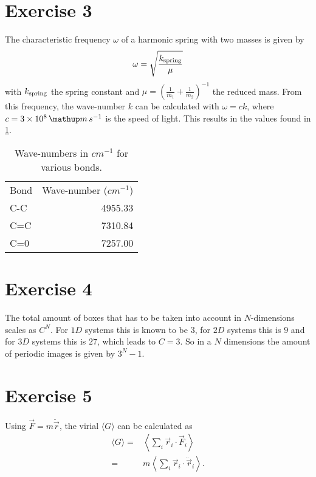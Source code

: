 \documentclass[titlepage]{report}
\begin{document}
\section{Exercise 3}
The characteristic frequency $ \omega $ of a harmonic spring with two masses is given by \cite[p. 164]{Taylor05}
\begin{equation}
	\omega = \sqrt{\frac{k_{\rm{spring}}}{\mu}} 
\end{equation}
with $ k_{\rm{spring}} $ the spring constant and $ \mu = \left(\frac{1}{m_1} + \frac{1}{m_2}\right)^{-1} $ the reduced mass. 
From this frequency, the wave-number $ k $ can be calculated with $ \omega = c k $, where $ c = 3\E{8}\unit{m \, s^{-1}} $ is the speed of light. This results in the values found in \cref{tab:THEX3wavenumbers}.
\begin{table}[h!]
	\centering
	\caption{Wave-numbers in $ \unit{cm^{-1}} $ for various bonds.}
	\label{tab:THEX3wavenumbers}
	\begin{tabular}{lr}
		Bond & Wave-number ($\unit{cm^{-1}}$) \\ 
		C-C & 4955.33 \\ 
		C=C & 7310.84 \\ 
		C=0 & 7257.00
	\end{tabular} 
\end{table}

\section{Exercise 4}
The total amount of boxes that has to be taken into account in $ N $-dimensions scales as $ C^N $.
For $ 1D $ systems this is known to be $ 3 $, for $ 2D $ systems this is $ 9 $ and for $ 3D $ systems this is $ 27 $, which leads to $ C=3 $.
So in a $ N $ dimensions the amount of periodic images is given by $ 3^N - 1 $.

\section{Exercise 5}
Using $ \vec{F} = m \ddot{\vec{r}} $, the virial $ \langle G \rangle $ can be calculated as
\begin{subequations}
	\begin{align}
		\langle G \rangle =& \left\langle \sum_i \vec{r}_i \cdot \vec{F}_i \right\rangle\\
		=& m \left\langle \sum_i \vec{r}_i \cdot \ddot{\vec{r}}_i \right\rangle.
	\end{align}
\end{subequations}
\end{document}

